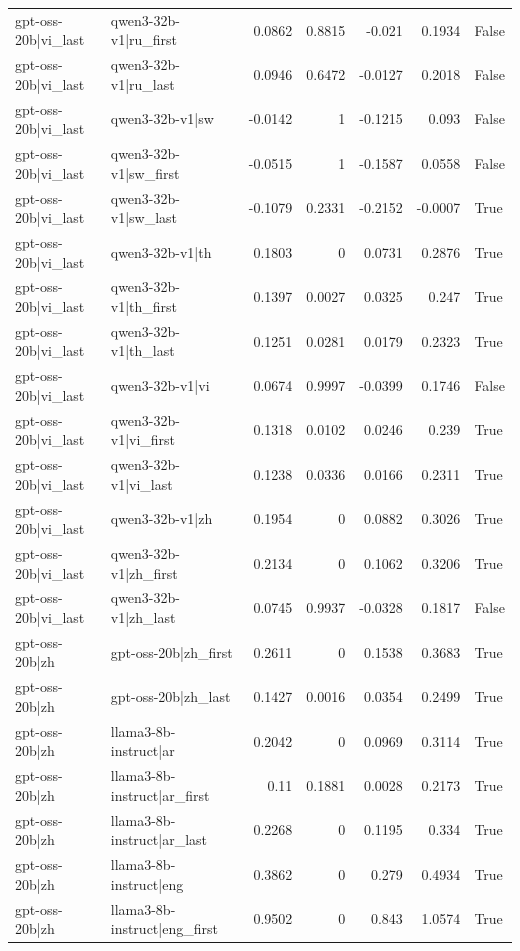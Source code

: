\begin{table}
\begin{tabular}{l l r r r r l}
gpt-oss-20b|vi_last & qwen3-32b-v1|ru_first & 0.0862 & 0.8815 & -0.021 & 0.1934 & False \\
gpt-oss-20b|vi_last & qwen3-32b-v1|ru_last & 0.0946 & 0.6472 & -0.0127 & 0.2018 & False \\
gpt-oss-20b|vi_last & qwen3-32b-v1|sw & -0.0142 & 1 & -0.1215 & 0.093 & False \\
gpt-oss-20b|vi_last & qwen3-32b-v1|sw_first & -0.0515 & 1 & -0.1587 & 0.0558 & False \\
gpt-oss-20b|vi_last & qwen3-32b-v1|sw_last & -0.1079 & 0.2331 & -0.2152 & -0.0007 & True \\
gpt-oss-20b|vi_last & qwen3-32b-v1|th & 0.1803 & 0 & 0.0731 & 0.2876 & True \\
gpt-oss-20b|vi_last & qwen3-32b-v1|th_first & 0.1397 & 0.0027 & 0.0325 & 0.247 & True \\
gpt-oss-20b|vi_last & qwen3-32b-v1|th_last & 0.1251 & 0.0281 & 0.0179 & 0.2323 & True \\
gpt-oss-20b|vi_last & qwen3-32b-v1|vi & 0.0674 & 0.9997 & -0.0399 & 0.1746 & False \\
gpt-oss-20b|vi_last & qwen3-32b-v1|vi_first & 0.1318 & 0.0102 & 0.0246 & 0.239 & True \\
gpt-oss-20b|vi_last & qwen3-32b-v1|vi_last & 0.1238 & 0.0336 & 0.0166 & 0.2311 & True \\
gpt-oss-20b|vi_last & qwen3-32b-v1|zh & 0.1954 & 0 & 0.0882 & 0.3026 & True \\
gpt-oss-20b|vi_last & qwen3-32b-v1|zh_first & 0.2134 & 0 & 0.1062 & 0.3206 & True \\
gpt-oss-20b|vi_last & qwen3-32b-v1|zh_last & 0.0745 & 0.9937 & -0.0328 & 0.1817 & False \\
gpt-oss-20b|zh & gpt-oss-20b|zh_first & 0.2611 & 0 & 0.1538 & 0.3683 & True \\
gpt-oss-20b|zh & gpt-oss-20b|zh_last & 0.1427 & 0.0016 & 0.0354 & 0.2499 & True \\
gpt-oss-20b|zh & llama3-8b-instruct|ar & 0.2042 & 0 & 0.0969 & 0.3114 & True \\
gpt-oss-20b|zh & llama3-8b-instruct|ar_first & 0.11 & 0.1881 & 0.0028 & 0.2173 & True \\
gpt-oss-20b|zh & llama3-8b-instruct|ar_last & 0.2268 & 0 & 0.1195 & 0.334 & True \\
gpt-oss-20b|zh & llama3-8b-instruct|eng & 0.3862 & 0 & 0.279 & 0.4934 & True \\
gpt-oss-20b|zh & llama3-8b-instruct|eng_first & 0.9502 & 0 & 0.843 & 1.0574 & True \\

\end{tabular}
\end{table}
